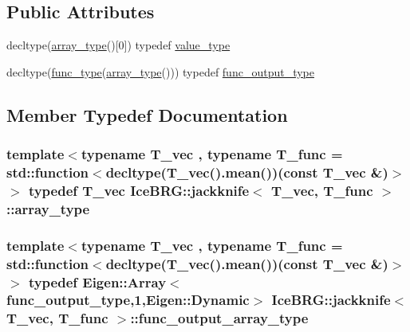 \subsection*{Public Attributes}
\begin{DoxyCompactItemize}
\item 
decltype(\hyperlink{classIceBRG_1_1jackknife_ad2892a939f8fc89723db89ac837317be}{array\+\_\+type}()\mbox{[}0\mbox{]}) typedef \hyperlink{classIceBRG_1_1jackknife_a31ed80992ab0c76c0b84122eb4186c92}{value\+\_\+type}
\item 
decltype(\hyperlink{classIceBRG_1_1jackknife_a3399a8fe403193ec9f56ef991dcbfce2}{func\+\_\+type}(\hyperlink{classIceBRG_1_1jackknife_ad2892a939f8fc89723db89ac837317be}{array\+\_\+type}())) typedef \hyperlink{classIceBRG_1_1jackknife_a1b24a65a9543f5708c9fc895620c031b}{func\+\_\+output\+\_\+type}
\end{DoxyCompactItemize}


\subsection{Member Typedef Documentation}
\hypertarget{classIceBRG_1_1jackknife_ad2892a939f8fc89723db89ac837317be}{}
\subsubsection[{array\+\_\+type}]{\setlength{\rightskip}{0pt plus 5cm}template$<$typename T\+\_\+vec , typename T\+\_\+func  = std\+::function$<$decltype(\+T\+\_\+vec().\+mean())(const T\+\_\+vec \&)$>$$>$ typedef T\+\_\+vec {\bf Ice\+B\+R\+G\+::jackknife}$<$ T\+\_\+vec, T\+\_\+func $>$\+::{\bf array\+\_\+type}}\label{classIceBRG_1_1jackknife_ad2892a939f8fc89723db89ac837317be}
\hypertarget{classIceBRG_1_1jackknife_a6eb000e6a82a691bfab8ca344e17186a}{}
\subsubsection[{func\+\_\+output\+\_\+array\+\_\+type}]{\setlength{\rightskip}{0pt plus 5cm}template$<$typename T\+\_\+vec , typename T\+\_\+func  = std\+::function$<$decltype(\+T\+\_\+vec().\+mean())(const T\+\_\+vec \&)$>$$>$ typedef Eigen\+::\+Array$<${\bf func\+\_\+output\+\_\+type},1,Eigen\+::\+Dynamic$>$ {\bf Ice\+B\+R\+G\+::jackknife}$<$ T\+\_\+vec, T\+\_\+func $>$\+::{\bf func\+\_\+output\+\_\+array\+\_\+type}}\label{classIceBRG_1_1jackknife_a6eb000e6a82a691bfab8ca344e17186a}
\hypertarget{classIceBRG_1_1jackknife_a3399a8fe403193ec9f56ef991dcbfce2}{}

